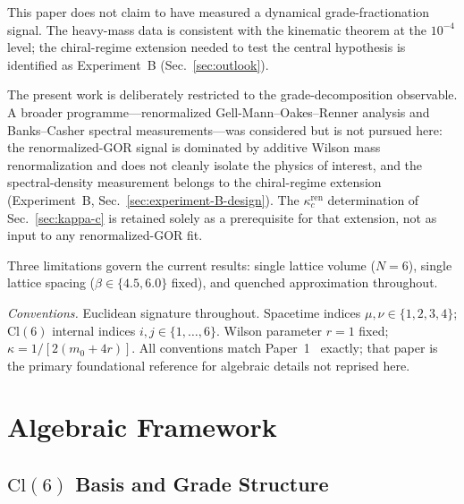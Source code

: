 \documentclass[12pt]{article}
\theoremstyle{definition}
\theoremstyle{remark}
\newcommand{\cl}{\mathrm{Cl}}           %
\newcommand{\kcren}{\kappa_{c}^{\mathrm{ren}}}      %
\begin{document}
	This paper does not claim to have measured a dynamical grade-fractionation
	signal.  The heavy-mass data is consistent with the kinematic theorem at the
	$10^{-4}$ level; the chiral-regime extension needed to test the central
	hypothesis is identified as Experiment~B
	(Sec.~\ref{sec:outlook}).
	
	The present work is deliberately restricted to the grade-decomposition
	observable.  A broader programme---renormalized Gell-Mann--Oakes--Renner
	analysis and Banks--Casher spectral measurements---was considered but is
	not pursued here: the renormalized-GOR signal is dominated by additive
	Wilson mass renormalization and does not cleanly isolate the physics of
	interest, and the spectral-density measurement belongs to the
	chiral-regime extension (Experiment~B, Sec.~\ref{sec:experiment-B-design}).
	The $\kcren$ determination of Sec.~\ref{sec:kappa-c} is retained solely as
	a prerequisite for that extension, not as input to any renormalized-GOR fit.
	
	Three limitations govern the current results:
	single lattice volume ($N=6$), single lattice spacing ($\beta\in\{4.5,6.0\}$
	fixed), and quenched approximation throughout.
	
	\medskip
	\noindent\textit{Conventions.}\enspace
	Euclidean signature throughout.  Spacetime indices $\mu,\nu\in\{1,2,3,4\}$;
	$\cl(6)$ internal indices $i,j\in\{1,\ldots,6\}$.  Wilson parameter $r=1$
	fixed; $\kappa=1/[2(m_0+4r)]$.  All conventions match
	Paper~1~\cite{FirestoneP1} exactly; that paper is the primary foundational
	reference for algebraic details not reprised here.
	
	\section{Algebraic Framework}
	\label{sec:framework}
	
	\subsection{\texorpdfstring{$\cl(6)$}{Cl(6)} Basis and Grade Structure}
	\label{sec:basis}
	
\end{document}
